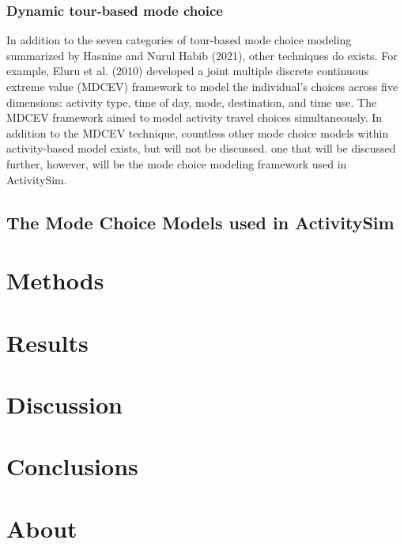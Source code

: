 \documentclass[12pt, oneside, openright]{byuthesis}
\begin{document}
\hypertarget{dynamic-tour-based-mode-choice}{%
\subsection{Dynamic tour-based mode choice}\label{dynamic-tour-based-mode-choice}}

In addition to the seven categories of tour-based mode choice modeling summarized by Hasnine and Nurul Habib (2021), other techniques do exists. For example, Eluru et al. (2010) developed a joint multiple discrete continuous extreme value (MDCEV) framework to model the individual's choices across five dimensions: activity type, time of day, mode, destination, and time use. The MDCEV framework aimed to model activity travel choices simultaneously. In addition to the MDCEV technique, countless other mode choice models within activity-based model exists, but will not be discussed. one that will be discussed further, however, will be the mode choice modeling framework used in ActivitySim.

\hypertarget{the-mode-choice-models-used-in-activitysim}{%
\section{The Mode Choice Models used in ActivitySim}\label{the-mode-choice-models-used-in-activitysim}}

\hypertarget{methods}{%
\chapter{Methods}\label{methods}}

\hypertarget{results}{%
\chapter{Results}\label{results}}

\hypertarget{discussion}{%
\chapter{Discussion}\label{discussion}}

\hypertarget{conclusions}{%
\chapter{Conclusions}\label{conclusions}}

\hypertarget{about}{%
\chapter{About}\label{about}}
\end{document}
